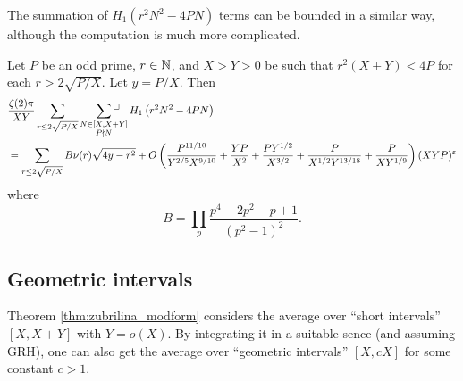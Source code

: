 The summation of $H_1(r^2 N^2 - 4PN)$ terms can be bounded in a similar way, although the computation is much more complicated.

\begin{proposition}
    Let $P$ be an odd prime, $r \in \mathbb{N}$, and $X > Y > 0$ be such that $r^2(X + Y) < 4 P$ for each $r > 2 \sqrt{P/X}$. Let $y = P/X$. Then
    \begin{align*}
        &\frac{\zeta(2) \pi}{ XY} \sum_{r \le 2 \sqrt{P/X}} \,\,\,\, \sideset{}{{}^\square}\sum_{\substack{N \in [X, X + Y] \\ P \nmid N}}  H_1\left(r^2 N^2 - 4 PN\right) \\
        &= \sum_{r \le 2 \sqrt{P/X}} B\nu(r) \sqrt{4y - r^2} + O\left(\frac{P^{11/10}}{Y^{2/5}X^{9/10}} + \frac{YP}{X^2} + \frac{PY^{1/2}}{X^{3/2}} + \frac{P}{X^{1/2} Y^{13/18}} + \frac{P}{XY^{1/9}}\right) (XYP)^\varepsilon
    \end{align*}
    where
    \[
    B = \prod_p \frac{p^4 - 2p^2 - p + 1}{(p^2 - 1)^2}.
    \]
\end{proposition}

\subsection{Geometric intervals}

Theorem \ref{thm:zubrilina_modform} considers the average over ``short intervals'' $[X, X + Y]$ with $Y = o(X)$.
By integrating it in a suitable sence (and assuming GRH), one can also get the average over ``geometric intervals'' $[X, cX]$ for some constant $c > 1$.

